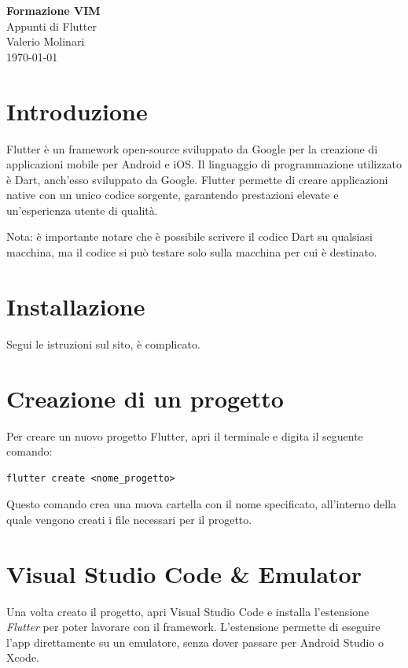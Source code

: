 \documentclass[12pt]{article}
\begin{document}
\begin{titlepage}
\begin{center}
\vspace*{3cm}
\Huge\textcolor{primary}{\textbf{Formazione VIM}} \\[1cm]
\Large\textcolor{secondary}{Appunti di Flutter} \\[1cm]
\textcolor{accent}{Valerio Molinari}\\
\vfill
\today
\end{center}
\end{titlepage}

\tableofcontents
\newpage

\section{Introduzione}
Flutter è un framework open-source sviluppato da Google per la creazione
di applicazioni mobile per Android e iOS.
Il linguaggio di programmazione utilizzato è Dart,
anch'esso sviluppato da Google.
Flutter permette di creare applicazioni native con un unico codice sorgente,
garantendo prestazioni elevate e un'esperienza utente di qualità.

\begin{highlight}
Nota: è importante notare che è possibile scrivere il codice Dart su qualsiasi
macchina, ma il codice si può testare solo sulla macchina per cui è destinato.
\end{highlight}

\section{Installazione}
Segui le istruzioni sul sito, è complicato.

\section{Creazione di un progetto}
Per creare un nuovo progetto Flutter, apri il terminale e digita il seguente comando:
\begin{verbatim}
flutter create <nome_progetto>
\end{verbatim}
Questo comando crea una nuova cartella con il nome specificato,
all'interno della quale vengono creati i file necessari per il progetto.

\section{Visual Studio Code \& Emulator}
Una volta creato il progetto, apri Visual Studio Code e installa l'estensione
\textit{Flutter} per poter lavorare con il framework.
L'estensione permette di eseguire l'app direttamente su un emulatore,
senza dover passare per Android Studio o Xcode.
\end{document}
